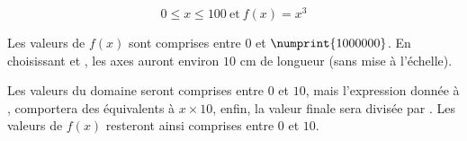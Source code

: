 \[
 0\leq x\leq 100 \ \text{et}\ f(x)=x^3
\]

Les valeurs de $f(x)$ sont comprises entre 0 et $\numprint{1000000}$. En choisissant  et , les axes auront environ $10$ cm de longueur (sans mise à l'échelle).

Les valeurs du domaine seront comprises entre $0$ et $10$, mais l'expression donnée à , comportera des   équivalents à $x \times 10$, enfin, la valeur finale  sera divisée par . Les valeurs de $f(x)$ resteront ainsi  comprises entre $0$ et $10$.
 
 \begin{tkzexample}[latex=10cm,small]
\end{tkzexample}




\endinput
